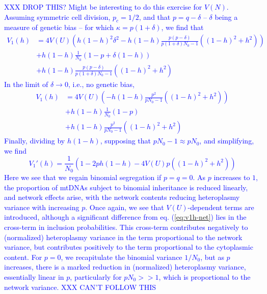 \documentclass{article}
\begin{document}
\begin{appendices}
\textcolor{blue}{XXX DROP THIS? Might be interesting to do this exercise for $V(N)$.
Assuming symmetric cell division, $p_c=1/2$, and that $p=q-\delta$ -- $\delta$ being a measure of genetic bias -- for which $\kappa = p(1+\delta)$, we find that
\begin{equation}
    \begin{split}
      V_1(h) & = 4V(U)\left(h(1-h)^2\delta^2-h(1-h)\frac{p(p-\delta)}{p(1+\delta)N_0-1}((1-h)^2+h^2)\right)\\
      & + h(1-h)\frac{1}{N_0}\left(1-p+\delta(1-h)\right)\\
      & + h(1-h)\frac{p(p-\delta)}{p(1+\delta)N_0-1}\left((1-h)^2+h^2\right)
    \end{split}
\end{equation}
In the limit of $\delta\rightarrow 0$, i.e., no genetic bias,
\begin{equation}
    \begin{split}
      V_1(h) & = 4V(U)\left(-h(1-h)\frac{p^2}{pN_0-1}((1-h)^2+h^2)\right)\\
      & + h(1-h)\frac{1}{N_0}\left(1-p\right)\\
      & + h(1-h)\frac{p^2}{pN_0-1}\left((1-h)^2+h^2\right)
    \end{split}
\end{equation}
Finally, dividing by $h(1-h)$, supposing that $pN_0-1\approx pN_0$, and simplifying, we find
\begin{equation}
      V_1'(h) = \frac{1}{N_0}\left(1-2ph(1-h)-4V(U)p((1-h)^2+h^2)\right)
\end{equation}
Here we see that we regain binomial segregation if $p=q=0$. As $p$ increases to $1$, the proportion of mtDNAs subject to binomial inheritance is reduced linearly, and network effects arise, with the network contents reducing heteroplasmy variance with increasing $p$. Once again, we see that $V(U)$-dependent terms are introduced, although a significant difference from eq. (\ref{eq:v1h-net}) lies in the cross-term in inclusion probabilities. This cross-term contributes negatively to (normalized) heteroplasmy variance in the term proportional to the network variance, but contributes positively to the term proportional to the cytoplasmic content. For $p=0$, we recapitulate the binomial variance $1/N_0$, but as $p$ increases, there is a marked reduction in (normalized) heteroplasmy variance, essentially linear in $p$, particularly for $pN_0>>1$, which is proportional to the network variance. XXX CAN'T FOLLOW THIS}



\end{appendices}
\end{document}

